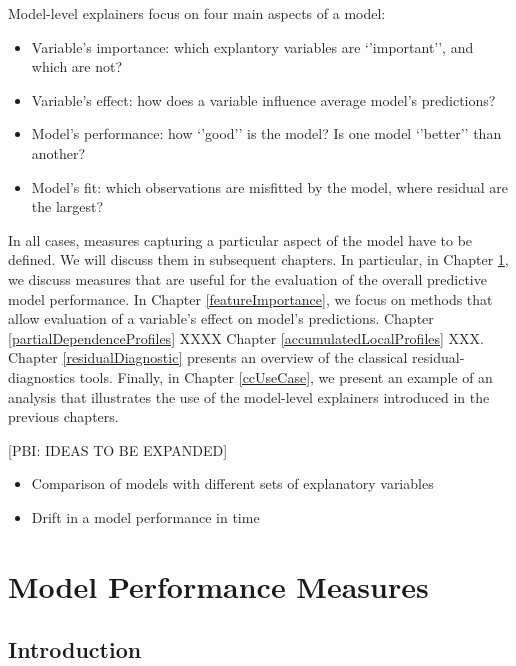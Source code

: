 \documentclass[12pt,]{krantz}
\providecommand{\tightlist}{%
  \setlength{\itemsep}{0pt}\setlength{\parskip}{0pt}}
\begin{document}
Model-level explainers focus on four main aspects of a model:

\begin{itemize}
\tightlist
\item
  Variable's importance: which explantory variables are `'important'', and which are not?
\item
  Variable's effect: how does a variable influence average model's predictions?
\item
  Model's performance: how `'good'' is the model? Is one model `'better'' than another?
\item
  Model's fit: which observations are misfitted by the model, where residual are the largest?
\end{itemize}

In all cases, measures capturing a particular aspect of the model have to be defined. We will discuss them in subsequent chapters. In particular, in Chapter \ref{modelPerformance}, we discuss measures that are useful for the evaluation of the overall predictive model performance. In Chapter \ref{featureImportance}, we focus on methods that allow evaluation of a variable's effect on model's predictions. Chapter \ref{partialDependenceProfiles} XXXX
Chapter \ref{accumulatedLocalProfiles} XXX. Chapter \ref{residualDiagnostic} presents an overview of the classical residual-diagnostics tools. Finally, in Chapter \ref{ccUseCase}, we present an example of an analysis that illustrates the use of the model-level explainers introduced in the previous chapters.

{[}PBI: IDEAS TO BE EXPANDED{]}

\begin{itemize}
\tightlist
\item
  Comparison of models with different sets of explanatory variables
\item
  Drift in a model performance in time
\end{itemize}

\hypertarget{modelPerformance}{%
\section{Model Performance Measures}\label{modelPerformance}}

\hypertarget{modelPerformanceIntro}{%
\subsection{Introduction}\label{modelPerformanceIntro}}
\end{document}
